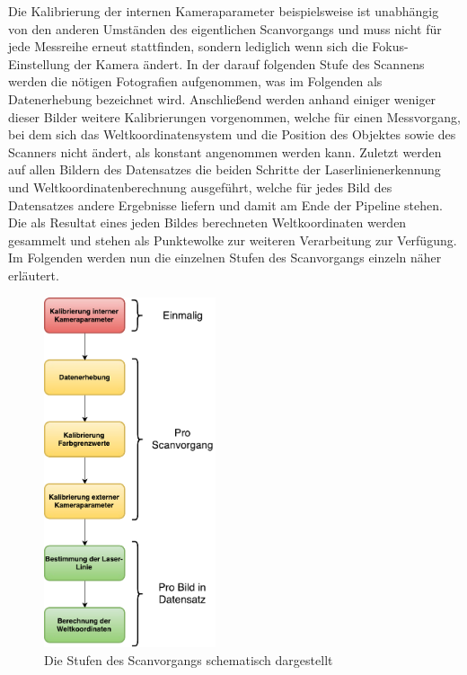 Die Kalibrierung der internen Kameraparameter beispielsweise ist unabhängig von den anderen Umständen des eigentlichen Scanvorgangs und muss nicht für jede Messreihe erneut stattfinden, sondern lediglich wenn sich die Fokus-Einstellung der Kamera ändert. In der darauf folgenden Stufe des Scannens werden die nötigen Fotografien aufgenommen, was im Folgenden als Datenerhebung bezeichnet wird. Anschließend werden anhand einiger weniger dieser Bilder weitere Kalibrierungen vorgenommen, welche für einen Messvorgang, bei dem sich das Weltkoordinatensystem und die Position des Objektes sowie des Scanners nicht ändert, als konstant angenommen werden kann. Zuletzt werden auf allen Bildern des Datensatzes die beiden Schritte der Laserlinienerkennung und Weltkoordinatenberechnung ausgeführt, welche für jedes Bild des Datensatzes andere Ergebnisse liefern und damit am Ende der Pipeline stehen. Die als Resultat eines jeden Bildes berechneten Weltkoordinaten werden gesammelt und stehen als Punktewolke zur weiteren Verarbeitung zur Verfügung. Im Folgenden werden nun die einzelnen Stufen des Scanvorgangs einzeln näher erläutert.


\begin{figure}
\centering 
\includegraphics[width=0.45\textwidth]{images/ScannerVerfahren.pdf}
\caption{Die Stufen des Scanvorgangs schematisch dargestellt}\label{fig:scanVorgang}
\end{figure}
\leavevmode

